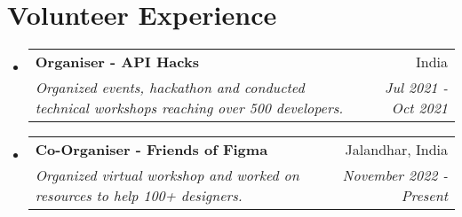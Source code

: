 \documentclass[a4paper,20pt]{article}
\makeatletter
\newcommand{\resumeSubheading}[4]{
  \vspace{-1pt}\item
    \begin{tabular*}{0.97\textwidth}{l@{\extracolsep{\fill}}r}
      \textbf{#1} & #2 \\
      \textit{#3} & \textit{#4} \\
    \end{tabular*}\vspace{-5pt}
}
\newcommand{\resumeSubHeadingListStart}{\begin{itemize}[leftmargin=*]}
\newcommand{\resumeSubHeadingListEnd}{\end{itemize}}
\makeatother
\begin{document}
\section{Volunteer Experience}
  \resumeSubHeadingListStart
	\resumeSubheading
    {Organiser - API Hacks}{India}
    {Organized events, hackathon and conducted technical workshops reaching over 500 developers.}{Jul 2021 - Oct 2021}
\vspace{5pt}
    \resumeSubheading
    {Co-Organiser - Friends of Figma}{Jalandhar, India}
    {Organized virtual workshop and worked on resources to help 100+ designers.}{November 2022 - Present}

\resumeSubHeadingListEnd
\end{document}
